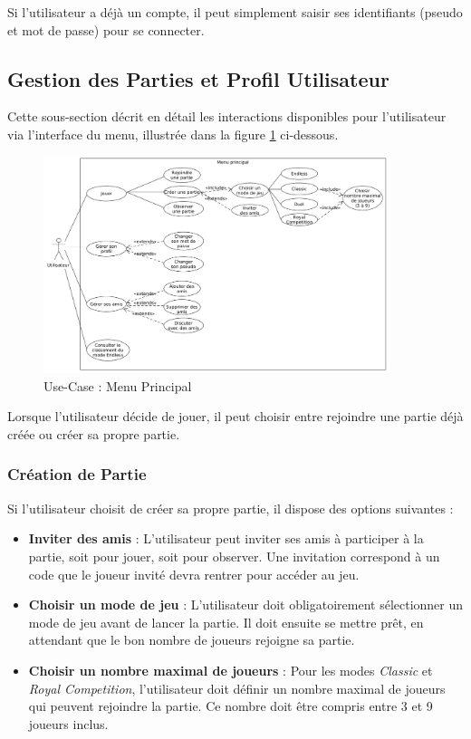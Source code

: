 \documentclass{report}
\begin{document}
\noindent Si l'utilisateur a déjà un compte, il peut simplement saisir ses identifiants (pseudo et mot de passe) pour se connecter.



\subsection{Gestion des Parties et Profil Utilisateur}

\noindent Cette sous-section décrit en détail les interactions disponibles pour l'utilisateur via l'interface du menu, illustrée dans la figure \ref{fig:use_case_menu} ci-dessous. 

\vspace{-1em}

\begin{figure}[H]
    \centering
     \includegraphics[width=0.9\textwidth, keepaspectratio]{src/user_req/menu.png}
    \caption{Use-Case : Menu Principal}
    \label{fig:use_case_menu}
\end{figure}

\noindent Lorsque l'utilisateur décide de jouer, il peut choisir entre rejoindre une partie déjà créée ou créer sa propre partie.

\subsubsection{Création de Partie}

\noindent Si l'utilisateur choisit de créer sa propre partie, il dispose des options suivantes :
\begin{itemize}
    \item \textbf{Inviter des amis} : L'utilisateur peut inviter ses amis à participer à la partie, soit pour jouer, soit pour observer. Une invitation correspond à un code que le joueur invité devra rentrer pour accéder au jeu.
    \item \textbf{Choisir un mode de jeu} : L'utilisateur doit obligatoirement sélectionner un mode de jeu avant de lancer la partie. Il doit ensuite se mettre prêt, en attendant que le bon nombre de joueurs rejoigne sa partie.
    \item \textbf{Choisir un nombre maximal de joueurs} : Pour les modes \emph{Classic} et \emph{Royal Competition}, l'utilisateur doit définir un nombre maximal de joueurs qui peuvent rejoindre la partie. Ce nombre doit être compris entre 3 et 9 joueurs inclus.
\end{itemize}
\end{document}
